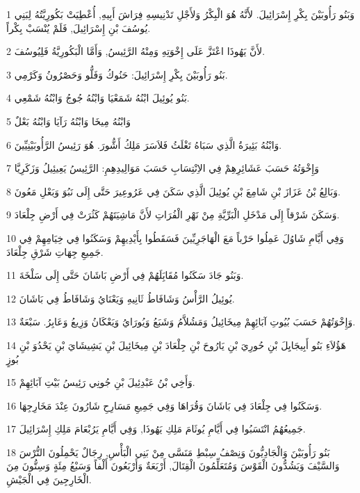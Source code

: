 \par 1 وَبَنُو رَأُوبَيْنَ بِكْرِ إِسْرَائِيلَ. لأَنَّهُ هُوَ الْبِكْرُ وَلأَجْلِ تَدْنِيسِهِ فِرَاشَ أَبِيهِ, أُعْطِيَتْ بَكُورِيَّتُهُ لِبَنِي يُوسُفَ بْنِ إِسْرَائِيلَ, فَلَمْ يُنْسَبْ بِكْراً.
\par 2 لأَنَّ يَهُوذَا اعْتَزَّ عَلَى إِخْوَتِهِ وَمِنْهُ الرَّئِيسُ, وَأَمَّا الْبَكُورِيَّةُ فَلِيُوسُفَ.
\par 3 بَنُو رَأُوبَيْنَ بِكْرِ إِسْرَائِيلَ: حَنُوكُ وَفَلُّو وَحَصْرُونُ وَكَرْمِي.
\par 4 بَنُو يُوئِيلَ ابْنُهُ شَمَعْيَا وَابْنُهُ جُوجُ وَابْنُهُ شَمْعِي.
\par 5 وَابْنُهُ مِيخَا وَابْنُهُ رَآيَا وَابْنُهُ بَعْلٌ
\par 6 وَابْنُهُ بَئِيرَةُ الَّذِي سَبَاهُ تَغْلَثُ فَلاَسَرَ مَلِكُ أَشُّورَ. هُوَ رَئِيسُ الرَّأُوبَيْنِيِّينَ.
\par 7 وَإِخْوَتُهُ حَسَبَ عَشَائِرِهِمْ فِي الاِنْتِسَابِ حَسَبَ مَوَالِيدِهِمِ: الرَّئِيسُ يَعِيئِيلُ وَزَكَرِيَّا
\par 8 وَبَالِعُ بْنُ عَزَازَ بْنِ شَامِعَ بْنِ يُوئِيلَ الَّذِي سَكَنَ فِي عَرُوعِيرَ حَتَّى إِلَى نَبُوَ وَبَعْلِ مَعُونَ.
\par 9 وَسَكَنَ شَرْقاً إِلَى مَدْخَلِ الْبَرِّيَّةِ مِنْ نَهْرِ الْفُرَاتِ لأَنَّ مَاشِيَتَهُمْ كَثُرَتْ فِي أَرْضِ جِلْعَادَ.
\par 10 وَفِي أَيَّامِ شَاوُلَ عَمِلُوا حَرْباً مَعَ الْهَاجَرِيِّينَ فَسَقَطُوا بِأَيْدِيهِمْ وَسَكَنُوا فِي خِيَامِهِمْ فِي جَمِيعِ جِهَاتِ شَرْقِ جِلْعَادَ.
\par 11 وَبَنُو جَادَ سَكَنُوا مُقَابَِلَهُمْ فِي أَرْضِ بَاشَانَ حَتَّى إِلَى سَلْخَةَ.
\par 12 يُوئِيلُ الرَّأْسُ وَشَافَاطُ ثَانِيهِ وَيَعْنَايُ وَشَافَاطُ فِي بَاشَانَ.
\par 13 وَإِخْوَتُهُمْ حَسَبَ بُيُوتِ آبَائِهِمْ مِيخَائِيلُ وَمَشُلاَّمُ وَشَبَعُ وَيُورَايُ وَيَعْكَانُ وَزِيعُ وَعَابِرُ. سَبْعَةٌ.
\par 14 هَؤُلاَءِ بَنُو أَبِيجَايِلَ بْنِ حُورِيَ بْنِ يَارُوحَ بْنِ جِلْعَادَ بْنِ مِيخَائِيلَ بْنِ يَشِيشَايَ بْنِ يَحْدُوَ بْنِ بُوزٍ
\par 15 وَأَخِي بْنُ عَبْدِئِيلَ بْنِ جُونِي رَئِيسُ بَيْتِ آبَائِهِمْ.
\par 16 وَسَكَنُوا فِي جِلْعَادَ فِي بَاشَانَ وَقُرَاهَا وَفِي جَمِيعِ مَسَارِحِ شَارُونَ عِنْدَ مَخَارِجِهَا.
\par 17 جَمِيعُهُمُ انْتَسَبُوا فِي أَيَّامِ يُوثَامَ مَلِكِ يَهُوذَا, وَفِي أَيَّامِ يَرُبْعَامَ مَلِكِ إِسْرَائِيلَ.
\par 18 بَنُو رَأُوبَيْنَ وَالْجَادِيُّونَ وَنِصْفُ سِبْطِ مَنَسَّى مِنْ بَنِي الْبَأْسِ, رِجَالٌ يَحْمِلُونَ التُّرْسَ وَالسَّيْفَ وَيَشُدُّونَ الْقَوْسَ وَمُتَعَلِّمُونَ الْقِتَالَ, أَرْبَعَةٌ وَأَرْبَعُونَ أَلْفاً وَسَبْعُ مِئَةٍ وَسِتُّونَ مِنَ الْخَارِجِينَ فِي الْجَيْشِ.
